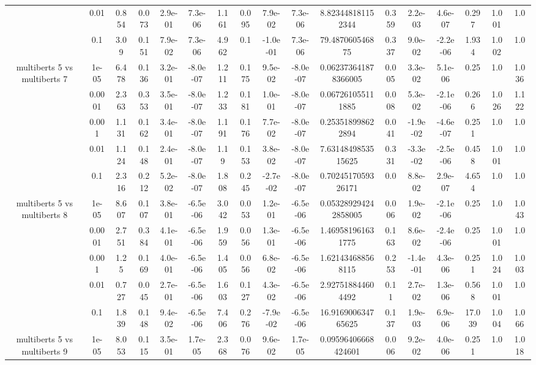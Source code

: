 \begin{tabular}{|c|c|c|c|c|c|c|c|c|c|c|c|c|c|c|c|c|}
 & 0.01 & 0.854 & 0.073 & 2.9e-01 & 7.3e-06 & 1.161 & 0.095 & 7.9e-02 & 7.3e-06 & 8.823448181152344 & 0.359 & 2.2e-03 & 4.6e-07 & 0.297 & 1.001 & 1.0 \\
 & 0.1 & 3.09 & 0.151 & 7.9e-02 & 7.3e-06 & 4.962 & 0.1 & -1.0e-01 & 7.3e-06 & 79.487060546875 & 0.337 & 9.0e-02 & -2.2e-06 & 1.934 & 1.002 & 1.0 \\
\hline
\multirow{5}{*}{multiberts 5 vs multiberts 7} & 1e-05 & 6.478 & 0.136 & 3.2e-01 & -8.0e-07 & 1.211 & 0.175 & 9.5e-02 & -8.0e-07 & 0.062373641878366005 & 0.005 & 3.3e-02 & 5.1e-06 & 0.25 & 1.0 & 1.036 \\
 & 0.0001 & 2.363 & 0.353 & 3.5e-01 & -8.0e-07 & 1.233 & 0.181 & 1.0e-01 & -8.0e-07 & 0.067261055111885 & 0.008 & 5.3e-02 & -2.1e-06 & 0.266 & 1.026 & 1.122 \\
 & 0.001 & 1.131 & 0.162 & 3.4e-01 & -8.0e-07 & 1.191 & 0.176 & 7.7e-02 & -8.0e-07 & 0.253518998622894 & 0.041 & -1.9e-02 & -4.6e-07 & 0.251 & 1.0 & 1.0 \\
 & 0.01 & 1.124 & 0.148 & 2.4e-01 & -8.0e-07 & 1.19 & 0.153 & 3.8e-02 & -8.0e-07 & 7.6314849853515625 & 0.331 & -3.3e-02 & -2.5e-06 & 0.458 & 1.001 & 1.0 \\
 & 0.1 & 2.316 & 0.212 & 5.2e-02 & -8.0e-07 & 1.808 & 0.245 & -2.7e-02 & -8.0e-07 & 0.7024517059326171 & 0.0 & 8.8e-02 & 2.9e-07 & 4.654 & 1.0 & 1.0 \\
\hline
\multirow{5}{*}{multiberts 5 vs multiberts 8} & 1e-05 & 8.607 & 0.107 & 3.8e-01 & -6.5e-06 & 3.042 & 0.053 & 1.2e-01 & -6.5e-06 & 0.053289294242858005 & 0.006 & 1.9e-02 & -2.1e-06 & 0.25 & 1.0 & 1.043 \\
 & 0.0001 & 2.751 & 0.384 & 4.1e-01 & -6.5e-06 & 1.959 & 0.056 & 1.3e-01 & -6.5e-06 & 1.469581961631775 & 0.163 & 8.6e-02 & -2.4e-06 & 0.25 & 1.001 & 1.0 \\
 & 0.001 & 1.25 & 0.169 & 4.0e-01 & -6.5e-06 & 1.405 & 0.056 & 6.8e-02 & -6.5e-06 & 1.621434688568115 & 0.253 & -1.4e-01 & 4.3e-06 & 0.251 & 1.024 & 1.003 \\
 & 0.01 & 0.727 & 0.045 & 2.7e-01 & -6.5e-06 & 1.603 & 0.127 & 4.3e-02 & -6.5e-06 & 2.927518844604492 & 0.11 & 2.7e-02 & 1.3e-06 & 0.568 & 1.001 & 1.0 \\
 & 0.1 & 1.839 & 0.148 & 9.4e-02 & -6.5e-06 & 7.406 & 0.276 & -7.9e-02 & -6.5e-06 & 16.916900634765625 & 0.137 & 1.9e-03 & 6.9e-06 & 17.039 & 1.004 & 1.066 \\
\hline
\multirow{5}{*}{multiberts 5 vs multiberts 9} & 1e-05 & 8.053 & 0.115 & 3.5e-01 & 1.7e-05 & 2.368 & 0.076 & 9.6e-02 & 1.7e-05 & 0.09596406668424601 & 0.006 & 9.2e-02 & 4.0e-06 & 0.251 & 1.0 & 1.018 \\

\end{tabular}
